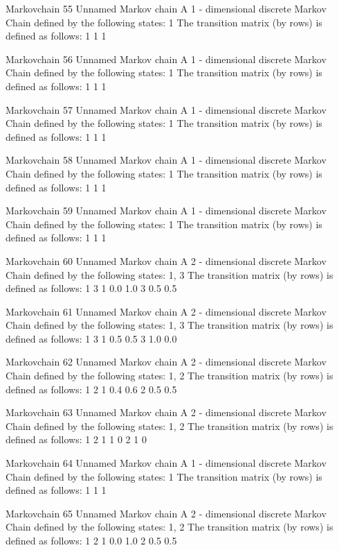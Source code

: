 \documentclass[
  nojss]{jss}
\begin{document}
\begin{CodeChunk}
\begin{CodeOutput}
Markovchain  55 
Unnamed Markov chain 
 A  1 - dimensional discrete Markov Chain defined by the following states: 
 1 
 The transition matrix  (by rows)  is defined as follows: 
  1
1 1

Markovchain  56 
Unnamed Markov chain 
 A  1 - dimensional discrete Markov Chain defined by the following states: 
 1 
 The transition matrix  (by rows)  is defined as follows: 
  1
1 1

Markovchain  57 
Unnamed Markov chain 
 A  1 - dimensional discrete Markov Chain defined by the following states: 
 1 
 The transition matrix  (by rows)  is defined as follows: 
  1
1 1

Markovchain  58 
Unnamed Markov chain 
 A  1 - dimensional discrete Markov Chain defined by the following states: 
 1 
 The transition matrix  (by rows)  is defined as follows: 
  1
1 1

Markovchain  59 
Unnamed Markov chain 
 A  1 - dimensional discrete Markov Chain defined by the following states: 
 1 
 The transition matrix  (by rows)  is defined as follows: 
  1
1 1

Markovchain  60 
Unnamed Markov chain 
 A  2 - dimensional discrete Markov Chain defined by the following states: 
 1, 3 
 The transition matrix  (by rows)  is defined as follows: 
    1   3
1 0.0 1.0
3 0.5 0.5

Markovchain  61 
Unnamed Markov chain 
 A  2 - dimensional discrete Markov Chain defined by the following states: 
 1, 3 
 The transition matrix  (by rows)  is defined as follows: 
    1   3
1 0.5 0.5
3 1.0 0.0

Markovchain  62 
Unnamed Markov chain 
 A  2 - dimensional discrete Markov Chain defined by the following states: 
 1, 2 
 The transition matrix  (by rows)  is defined as follows: 
    1   2
1 0.4 0.6
2 0.5 0.5

Markovchain  63 
Unnamed Markov chain 
 A  2 - dimensional discrete Markov Chain defined by the following states: 
 1, 2 
 The transition matrix  (by rows)  is defined as follows: 
  1 2
1 1 0
2 1 0

Markovchain  64 
Unnamed Markov chain 
 A  1 - dimensional discrete Markov Chain defined by the following states: 
 1 
 The transition matrix  (by rows)  is defined as follows: 
  1
1 1

Markovchain  65 
Unnamed Markov chain 
 A  2 - dimensional discrete Markov Chain defined by the following states: 
 1, 2 
 The transition matrix  (by rows)  is defined as follows: 
    1   2
1 0.0 1.0
2 0.5 0.5


\end{CodeOutput}
\end{CodeChunk}
\end{document}

